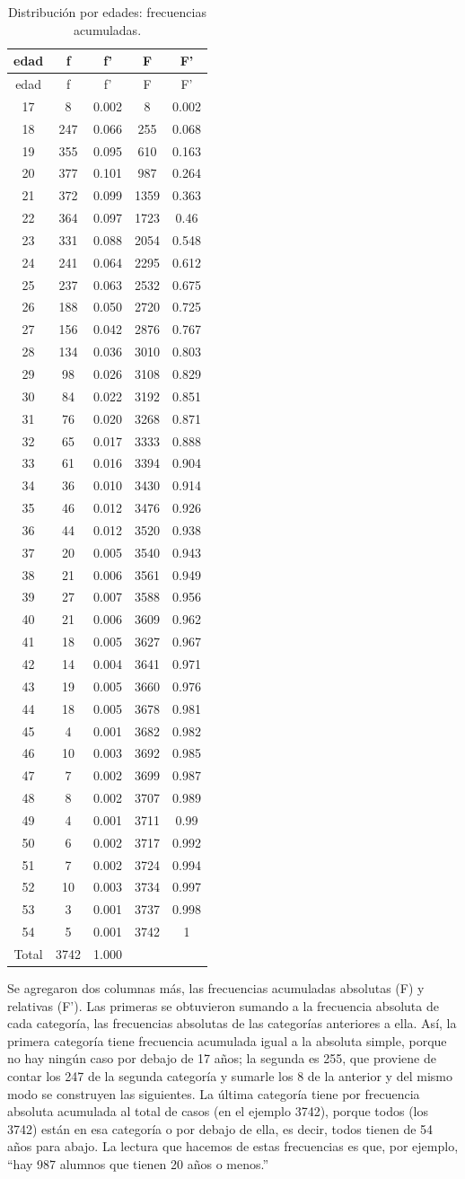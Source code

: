 \documentclass[]{book}
\begin{document}
\begin{longtable}[]{@{}ccccc@{}}
\caption{\label{tab:unnamed-chunk-47}Distribución por edades: frecuencias acumuladas.}\tabularnewline
\toprule
edad & f & f' & F & F'\tabularnewline
\midrule
\endfirsthead
\toprule
edad & f & f' & F & F'\tabularnewline
\midrule
\endhead
17 & 8 & 0.002 & 8 & 0.002\tabularnewline
18 & 247 & 0.066 & 255 & 0.068\tabularnewline
19 & 355 & 0.095 & 610 & 0.163\tabularnewline
20 & 377 & 0.101 & 987 & 0.264\tabularnewline
21 & 372 & 0.099 & 1359 & 0.363\tabularnewline
22 & 364 & 0.097 & 1723 & 0.46\tabularnewline
23 & 331 & 0.088 & 2054 & 0.548\tabularnewline
24 & 241 & 0.064 & 2295 & 0.612\tabularnewline
25 & 237 & 0.063 & 2532 & 0.675\tabularnewline
26 & 188 & 0.050 & 2720 & 0.725\tabularnewline
27 & 156 & 0.042 & 2876 & 0.767\tabularnewline
28 & 134 & 0.036 & 3010 & 0.803\tabularnewline
29 & 98 & 0.026 & 3108 & 0.829\tabularnewline
30 & 84 & 0.022 & 3192 & 0.851\tabularnewline
31 & 76 & 0.020 & 3268 & 0.871\tabularnewline
32 & 65 & 0.017 & 3333 & 0.888\tabularnewline
33 & 61 & 0.016 & 3394 & 0.904\tabularnewline
34 & 36 & 0.010 & 3430 & 0.914\tabularnewline
35 & 46 & 0.012 & 3476 & 0.926\tabularnewline
36 & 44 & 0.012 & 3520 & 0.938\tabularnewline
37 & 20 & 0.005 & 3540 & 0.943\tabularnewline
38 & 21 & 0.006 & 3561 & 0.949\tabularnewline
39 & 27 & 0.007 & 3588 & 0.956\tabularnewline
40 & 21 & 0.006 & 3609 & 0.962\tabularnewline
41 & 18 & 0.005 & 3627 & 0.967\tabularnewline
42 & 14 & 0.004 & 3641 & 0.971\tabularnewline
43 & 19 & 0.005 & 3660 & 0.976\tabularnewline
44 & 18 & 0.005 & 3678 & 0.981\tabularnewline
45 & 4 & 0.001 & 3682 & 0.982\tabularnewline
46 & 10 & 0.003 & 3692 & 0.985\tabularnewline
47 & 7 & 0.002 & 3699 & 0.987\tabularnewline
48 & 8 & 0.002 & 3707 & 0.989\tabularnewline
49 & 4 & 0.001 & 3711 & 0.99\tabularnewline
50 & 6 & 0.002 & 3717 & 0.992\tabularnewline
51 & 7 & 0.002 & 3724 & 0.994\tabularnewline
52 & 10 & 0.003 & 3734 & 0.997\tabularnewline
53 & 3 & 0.001 & 3737 & 0.998\tabularnewline
54 & 5 & 0.001 & 3742 & 1\tabularnewline
Total & 3742 & 1.000 & &\tabularnewline
\bottomrule
\end{longtable}

Se agregaron dos columnas más, las frecuencias acumuladas absolutas (F) y relativas (F'). Las primeras se obtuvieron sumando a la frecuencia absoluta de cada categoría, las frecuencias absolutas de las categorías anteriores a ella. Así, la primera categoría tiene frecuencia acumulada igual a la absoluta simple, porque no hay ningún caso por debajo de 17 años; la segunda es 255, que proviene de contar los 247 de la segunda categoría y sumarle los 8 de la anterior y del mismo modo se construyen las siguientes. La última categoría tiene por frecuencia absoluta acumulada al total de casos (en el ejemplo 3742), porque todos (los 3742) están en esa categoría o por debajo de ella, es decir, todos tienen de 54 años para abajo. La lectura que hacemos de estas frecuencias es que, por ejemplo, ``hay 987 alumnos que tienen 20 años o menos.''
\end{document}
